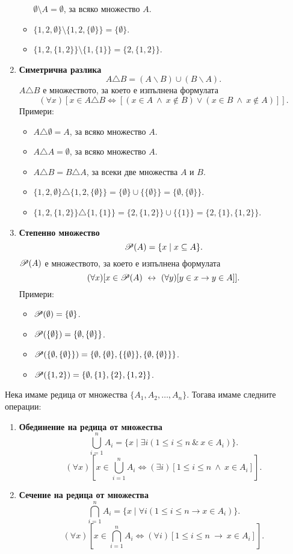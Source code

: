 \begin{enumerate}[{\bf (I)}]
\begin{itemize}
      $\emptyset \setminus A = \emptyset$, за всяко множество $A$.
    \item
      $\{1,2,\emptyset\} \setminus \{1,2,\{\emptyset\}\} = \{\emptyset\}$.
    \item
      $\{1,2,\{1,2\}\} \setminus \{1,\{1\}\} = \{2,\{1,2\}\}$.
    \end{itemize}
  \item
    {\bf Симетрична разлика}
    \[A\triangle B = (A\backslash B)\cup (B\backslash A).\]
    $A\triangle B$ е множеството, за което е изпълнена формулата
    \[(\forall x)[x \in A\triangle B \iff [(x\in A\ \wedge\ x \not\in B) \vee (x \in B\ \wedge\ x\not\in A)]].\]
    Примери:
    \begin{itemize}
    \item 
      $A \triangle \emptyset = A$, за всяко множество $A$.
    \item
      $A \triangle A = \emptyset$, за всяко множество $A$.
    \item
      $A\triangle B = B \triangle A$, за всеки две множества $A$ и $B$.
    \item
      $\{1,2,\emptyset\} \triangle \{1,2,\{\emptyset\}\} = \{\emptyset\} \cup \{\{\emptyset\}\} = \{\emptyset,\{\emptyset\}\}$.
    \item
      $\{1,2,\{1,2\}\} \triangle \{1,\{1\}\} = \{2,\{1,2\}\} \cup \{\{1\}\} = \{2,\{1\},\{1,2\}\}$.
    \end{itemize}
  \item
    {\bf Степенно множество}
    \[\mathscr{P}(A) = \{x\mid x\subseteq A\}.\]
    $\mathscr{P}(A)$ е множеството, за което е изпълнена формулата
    \[(\forall x)[x \in \mathscr{P}(A) \ \leftrightarrow\  (\forall y)[y\in x\rightarrow y \in A]].\]
    Примери:
    \begin{itemize}
    \item 
      $\mathscr{P}(\emptyset) = \{\emptyset\}$.
    \item
      $\mathscr{P}(\{\emptyset\}) = \{\emptyset,\{\emptyset\}\}$.
    \item
      $\mathscr{P}(\{\emptyset,\{\emptyset\}\}) = \{\emptyset,\{\emptyset\},\{\{\emptyset\}\},\{\emptyset,\{\emptyset\}\}\}$.
    \item
      $\mathscr{P}(\{1,2\}) = \{\emptyset,\{1\},\{2\},\{1,2\}\}$.
    \end{itemize}
  \end{enumerate}
  Нека имаме редица от множества $\{A_1,A_2,\dots,A_n\}$.
  Тогава имаме следните операции:
  \begin{enumerate}[{\bf (I)}]
  \item
    {\bf Обединение на редица от множества}
    \[\bigcup^{n}_{i=1} A_i = \{x \mid \exists i (1\leq i\leq n\ \&\ x\in A_i)\}.\]
    \[(\forall x)[x \in \bigcup^n_{i=1}A_i \iff (\exists i)[1 \leq i \leq n\ \wedge\ x \in A_i]].\]
  \item
    {\bf Сечение на редица от множества}
    \[\bigcap^{n}_{i=1} A_i = \{x \mid \forall i (1\leq i\leq n \rightarrow x\in A_i)\}.\]
    \[(\forall x)[x \in \bigcap^n_{i=1}A_i \iff (\forall i)[1 \leq i \leq n\ \rightarrow\ x \in A_i]].\]
  \end{enumerate}

